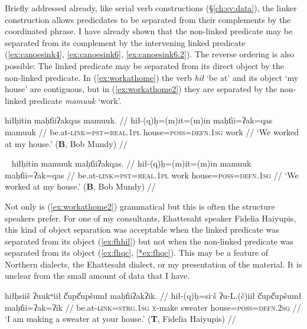 Briefly addressed already, like serial verb constructions (\S\ref{ch:sv:data}), the linker construction allows predicdates to be separated from their complements by the coordinated phrase. I have already shown that the non-linked predicate may be separated from its complement by the intervening linked predicate (\ref{ex:canoesink4}, \ref{ex:canoesink6}, \ref{ex:canoesink6.2}). The reverse ordering is also possible: The linked predicate may be separated from its direct object by the non-linked predicate. In (\ref{ex:workathome}) the verb \textit{hił} `be at' and its object `my house' are contiguous, but in (\ref{ex:workathome2}) they are separated by the non-linked predicate \textit{mamuuk} `work'.

\ex \label{ex:workathome}
\begingl
\glpreamble hiłḥitin maḥt̓iiʔakqas mamuuk. //
\gla hił-(q)ḥ=(m)it=(m)in maḥt̓ii=ʔak=qas mamuuk //
\glb be.at-\textsc{link}=\textsc{pst}=\textsc{real.1pl} house=\textsc{poss}=\textsc{defn.1sg} work //
\glft `We worked at my house.' (\textbf{B}, Bob Mundy) //
\endgl
\xe

\ex~ \label{ex:workathome2}
\begingl
\glpreamble hiłḥitin mamuuk maḥt̓iiʔakqas. //
\gla hił-(q)ḥ=(m)it=(m)in mamuuk maḥt̓ii=ʔak=qas //
\glb be.at-\textsc{link}=\textsc{pst}=\textsc{real.1pl} work house=\textsc{poss}=\textsc{defn.1sg} //
\glft `We worked at my house.' (\textbf{B}, Bob Mundy) //
\endgl
\xe

Not only is (\ref{ex:workathome2}) grammatical but this is often the structure speakers prefer. For one of my consultants, Ehattesaht speaker Fidelia Haiyupis, this kind of object separation was acceptable when the linked predicate was separated from its object (\ref{ex:fhhil}) but not when the non-linked predicate was separated from its object (\ref{ex:fhqc}, \ref{*ex:fhqc}). This may be a feature of Northern dialects, the Ehattesaht dialect, or my presentation of the material. It is unclear from the small amount of data that I have. %

\ex \label{ex:fhhil}
\begingl
\glpreamble hiłḥsiiš ʔuukʷiił č̓upč̓upšumł maḥt̓iiʔakʔik. //
\gla hił-(q)ḥ=siˑš ʔu-L.(č)iił č̓upč̓upšumł maḥt̓ii=ʔak=ʔik //
\glb be.at-\textsc{link}=\textsc{strg.1sg} \textsc{x}-make sweater house=\textsc{poss}=\textsc{defn.2sg} //
\glft `I am making a sweater at your house.' (\textbf{T}, Fidelia Haiyupis) //
\endgl
\xe

